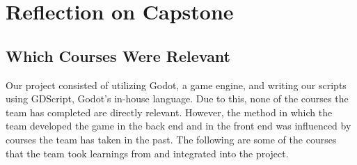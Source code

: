 \documentclass{article}
\begin{document}
\section{Reflection on Capstone}

\subsection{Which Courses Were Relevant}

Our project consisted of utilizing Godot, a game engine, and writing our scripts using GDScript, Godot's in-house language. Due to this, none of the courses the team has completed are directly relevant. However, the method in which the team developed the game in the back end and in the front end was influenced by courses the team has taken in the past. The following are some of the courses that the team took learnings from and integrated into the project. 
\end{document}

